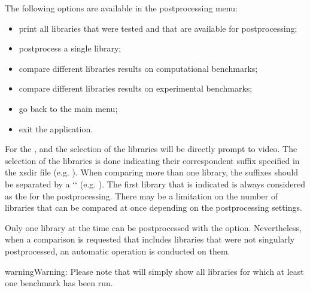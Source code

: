 \documentclass[letterpaper,10pt,english]{sphinxmanual}
\begin{document}
The following options are available in the post\sphinxhyphen{}processing menu:
\begin{itemize}
\item {} 
 print all libraries that were tested and that are available for post\sphinxhyphen{}processing;

\item {} 
 post\sphinxhyphen{}process a single library;

\item {} 
 compare different libraries results on computational benchmarks;

\item {} 
 compare different libraries results on experimental benchmarks;

\item {} 
 go back to the main menu;

\item {} 
 exit the application.

\end{itemize}

For the ,  and  the selection of the libraries will be directly prompt to video.
The selection of the libraries is done indicating their correspondent suffix specified in the xsdir file
(e.g. ). When comparing more than one library, the suffixes should be separated by a ‘\sphinxhyphen{}‘ (e.g. ).
The first library that is indicated is always considered as the  for the post\sphinxhyphen{}processing.
There may be a limitation on the number of libraries that can be compared at once depending on the post\sphinxhyphen{}processing settings.

Only one library at the time can be post\sphinxhyphen{}processed with the  option. Nevertheless, when a comparison is requested that
includes libraries that were not singularly post\sphinxhyphen{}processed, an automatic  operation is conducted on them.

\begin{sphinxadmonition}{warning}{Warning:}
Please note that  will simply show all libraries for which at least one benchmark has been run.
\end{sphinxadmonition}
\end{document}
